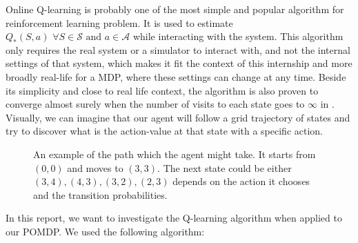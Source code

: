\documentclass[
  a4paper, xcolor = usenames,dvipsnames]{article}
\begin{document}
Online Q-learning is probably one of the most simple and popular algorithm for reinforcement learning problem. It is used to estimate \(Q_{*}(S, a) \,\, \forall S \in \mathcal{S} \text{ and } a \in \mathcal{A}\) while interacting with the system. This algorithm only requires the real system or a simulator to interact with, and not the internal settings of that system, which makes it fit the context of this internship and more broadly real-life for a MDP, where these settings can change at any time. Beside its simplicity and close to real life context, the algorithm is also proven to converge almost surely when the number of visits to each state goes to \(\infty\) in \autocite{q-learning-converge}. Visually, we can imagine that our agent will follow a grid trajectory of states and try to discover what is the action-value at that state with a specific action.

\begin{figure}
\centering
\def\mycolumns{5}
\def\myrows{5}
\caption[An example of the path which the agent might take]{An example of the path which the agent might take. It starts from $(0, 0)$ and moves to $(3, 3)$. The next state could be either $(3, 4), (4, 3), (3, 2), (2, 3)$ depends on the action it chooses and the transition probabilities.}
\end{figure}

In this report, we want to investigate the Q-learning algorithm when applied to our POMDP. We used the following algorithm:
\end{document}
